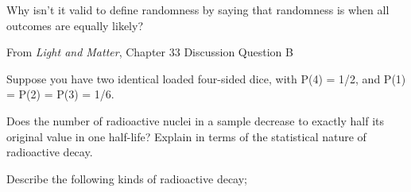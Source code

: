 \documentclass[12pt]{exam}
\begin{document}
\begin{questions}
	\question Why isn't it valid to define randomness by saying that randomness is when all outcomes are equally likely?
		
	
	From \textit{Light and Matter}, Chapter 33 Discussion Question B
	\vspace{0.5in}
	
	\clearpage
\question Suppose you have two identical loaded four-sided dice, with P(4) = 1/2, and P(1) = P(2) = P(3) = 1/6. 

\question Does the number of radioactive nuclei in a sample decrease to exactly half its original value in one half-life? Explain in terms of the statistical nature of radioactive decay.
	\vspace{1in}
	
	\question Describe the following kinds of radioactive decay;
\end{questions}
\end{document}
